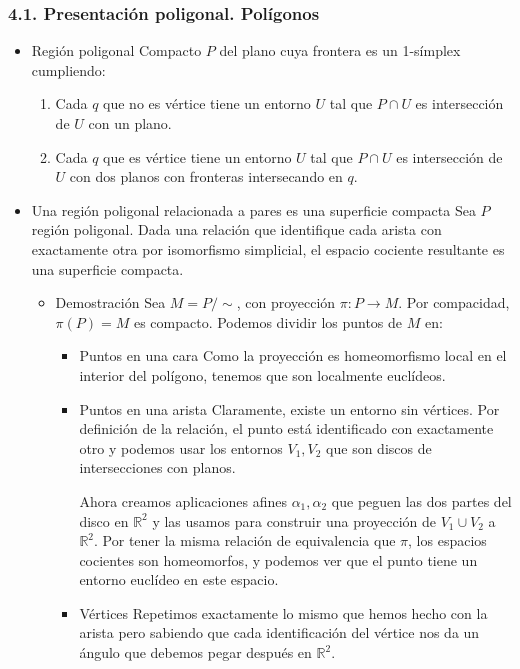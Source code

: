 \documentclass[11pt]{article}
\begin{document}
\subsubsection*{4.1. Presentación poligonal. Polígonos}
\label{sec-1-4-5}
\begin{itemize}
\item Región poligonal
\label{sec-1-4-5-1}
Compacto $P$ del plano cuya frontera es un 1-símplex cumpliendo:

\begin{enumerate}
\item Cada $q$ que no es vértice tiene un entorno $U$ tal que $P \cap U$ es
intersección de $U$ con un plano.
\item Cada $q$ que es vértice tiene un entorno $U$ tal que $P \cap U$ es
intersección de $U$ con dos planos con fronteras intersecando en $q$.
\end{enumerate}

\item Una región poligonal relacionada a pares es una superficie compacta
\label{sec-1-4-5-2}
Sea $P$ región poligonal. Dada una relación que identifique cada 
arista con exactamente otra por isomorfismo simplicial, el
espacio cociente resultante es una superficie compacta.

\begin{itemize}
\item Demostración
\label{sec-1-4-5-2-1}
Sea $M = P/\sim$, con proyección $\pi:P \longrightarrow M$. Por compacidad, $\pi(P) = M$
es compacto. Podemos dividir los puntos de $M$ en:

\begin{itemize}
\item Puntos en una cara
\label{sec-1-4-5-2-1-1}
Como la proyección es homeomorfismo local en el interior del polígono,
tenemos que son localmente euclídeos.

\item Puntos en una arista
\label{sec-1-4-5-2-1-2}
Claramente, existe un entorno sin vértices. Por definición de la
relación, el punto está identificado con exactamente otro y podemos
usar los entornos $V_1,V_2$ que son discos de intersecciones con planos.

Ahora creamos aplicaciones afines $\alpha_1,\alpha_2$ que peguen las dos partes del 
disco en $\mathbb{R}^2$ y las usamos para construir una proyección de $V_1\cup V_2$ a
$\mathbb{R}^2$. Por tener la misma relación de equivalencia que $\pi$, los espacios
cocientes son homeomorfos, y podemos ver que el punto tiene un
entorno euclídeo en este espacio.

\item Vértices
\label{sec-1-4-5-2-1-3}
Repetimos exactamente lo mismo que hemos hecho con la arista pero
sabiendo que cada identificación del vértice nos da un ángulo que
debemos pegar después en $\mathbb{R}^2$.
\end{itemize}
\end{itemize}
\end{itemize}
\end{document}
